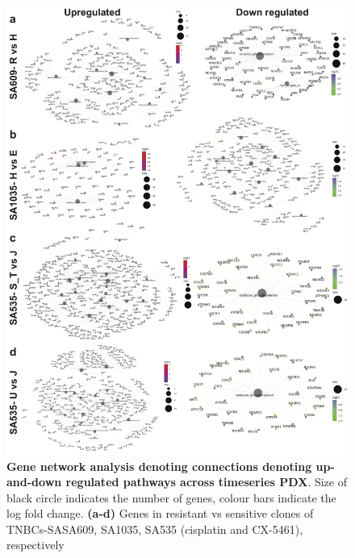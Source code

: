 \begin{figure}
\centering
  \includegraphics[width=\textwidth]{Figures/chap5/genenetworkanalysis.png}
\caption[DE of resistant and sensitive clonealign defined clones]
	{\small
	\textbf{Gene network analysis denoting connections denoting up-and-down regulated pathways across timeseries PDX}. Size of black circle indicates the number of genes, colour bars indicate the log fold change.
	\textbf{(a-d)} Genes in resistant vs sensitive clones of TNBCs-SASA609, SA1035, SA535 (cisplatin and CX-5461), respectively}
	  
	   	\label{fig:genenetworkanalysis}
\end{figure} 

